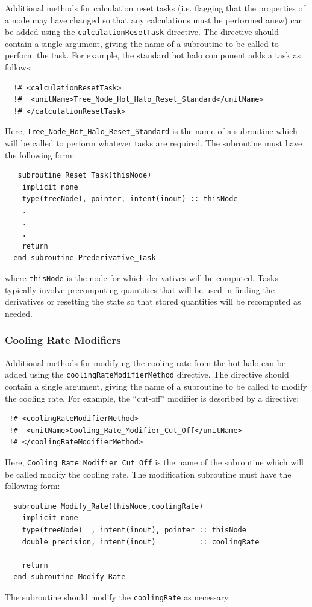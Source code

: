 Additional methods for calculation reset tasks (i.e. flagging that the properties of a node may have changed so that any calculations must be performed anew) can be added using the {\tt calculationResetTask} directive. The directive should contain a single argument, giving the name of a subroutine to be called to perform the task. For example, the standard hot halo component adds a task as follows:
\begin{verbatim}
  !# <calculationResetTask>
  !#  <unitName>Tree_Node_Hot_Halo_Reset_Standard</unitName>
  !# </calculationResetTask>
\end{verbatim}
Here, {\tt Tree\_Node\_Hot\_Halo\_Reset\_Standard} is the name of a subroutine which will be called to perform whatever tasks are required. The subroutine must have the following form:
\begin{verbatim}
   subroutine Reset_Task(thisNode)
    implicit none
    type(treeNode), pointer, intent(inout) :: thisNode
    .
    .
    .
    return
  end subroutine Prederivative_Task
\end{verbatim}
where {\tt thisNode} is the node for which derivatives will be computed. Tasks typically involve precomputing quantities that will be used in finding the derivatives or resetting the state so that stored quantities will be recomputed as needed.

\subsubsection{Cooling Rate Modifiers}

Additional methods for modifying the cooling rate from the hot halo can be added using the {\tt coolingRateModifierMethod} directive. The directive should contain a single argument, giving the name of a subroutine to be called to modify the cooling rate. For example, the ``cut-off'' modifier is described by a directive:
\begin{verbatim}
 !# <coolingRateModifierMethod>
 !#  <unitName>Cooling_Rate_Modifier_Cut_Off</unitName>
 !# </coolingRateModifierMethod>
\end{verbatim}
Here, {\tt Cooling\_Rate\_Modifier\_Cut\_Off} is the name of the subroutine which will be called modify the cooling rate. The modification subroutine must have the following form:
\begin{verbatim}
  subroutine Modify_Rate(thisNode,coolingRate)
    implicit none
    type(treeNode)  , intent(inout), pointer :: thisNode
    double precision, intent(inout)          :: coolingRate    

    return
  end subroutine Modify_Rate
\end{verbatim}
The subroutine should modify the {\tt coolingRate} as necessary.

